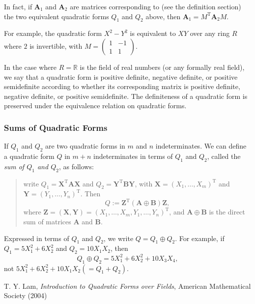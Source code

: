 \documentclass{article}
\newcommand{\bX}{\mathbf{X}}
\newcommand{\bA}{\mathbf{A}}
\newcommand{\bB}{\mathbf{B}}
\newcommand{\bY}{\mathbf{Y}}
\newcommand{\bZ}{\mathbf{Z}}
\newcommand{\0}{\mathbf{0}}
\begin{document}
In fact, if $\bA_1$ and $\bA_2$ are matrices corresponding to (see the definition section) the two equivalent quadratic forms $Q_1$ and $Q_2$ above, then $\bA_1=M^\mathrm{T}\bA_2M$.

For example, the quadratic form $X^2-Y^2$ is equivalent to $XY$ over any ring $R$ where $2$ is invertible, with $M=\begin{pmatrix} 1 & -1 \\ 1 & 1 \end{pmatrix}$.

In the case where $R=\mathbb{R}$ is the field of real numbers (or any formally real field), we say that a quadratic form is positive definite, negative definite, or positive semidefinite according to whether its corresponding matrix is positive definite, negative definite, or positive semidefinite.  The definiteness of a quadratic form is preserved under the equivalence relation on quadratic forms.

\subsubsection*{Sums of Quadratic Forms}

If $Q_1$ and $Q_2$ are two quadratic forms in $m$ and $n$ indeterminates.  We can define a quadratic form $Q$ in $m+n$ indeterminates in terms of $Q_1$ and $Q_2$, called the \emph{sum of $Q_1$ and $Q_2$}, as follows:
\begin{quote}
write $Q_1={\bX}^{\mathrm{T}} \bA \bX$ and $Q_2={\bY}^{\mathrm{T}} \bB \bY$, with $\bX=(X_1,\ldots,X_m)^{\mathrm{T}}$ and $\bY=(Y_1,\ldots,Y_n)^{\mathrm{T}}$.  Then 
$$Q:={\bZ}^{\mathrm{T}} (\bA\oplus \bB) \bZ,$$ 
where $\bZ=(\bX,\bY)=(X_1,\ldots,X_m,Y_1,\ldots,Y_n)^{\mathrm{T}}$, and $\bA\oplus \bB$ is the direct sum of matrices $\bA$ and $\bB$.
\end{quote}
Expressed in terms of $Q_1$ and $Q_2$, we write $Q=Q_1\oplus Q_2$.  For example, if $Q_1=5X_1^2+6X_2^2$ and $Q_2=10X_1X_2$, then $$Q_1\oplus Q_2=5X_1^2+6X_2^2+10X_3X_4,$$ not $5X_1^2+6X_2^2+10X_1X_2 (=Q_1+Q_2)$.

\begin{thebibliography}{6}
 T. Y. Lam, {\it Introduction to Quadratic Forms over Fields}, American Mathematical Society (2004)
\end{thebibliography}
\end{document}
